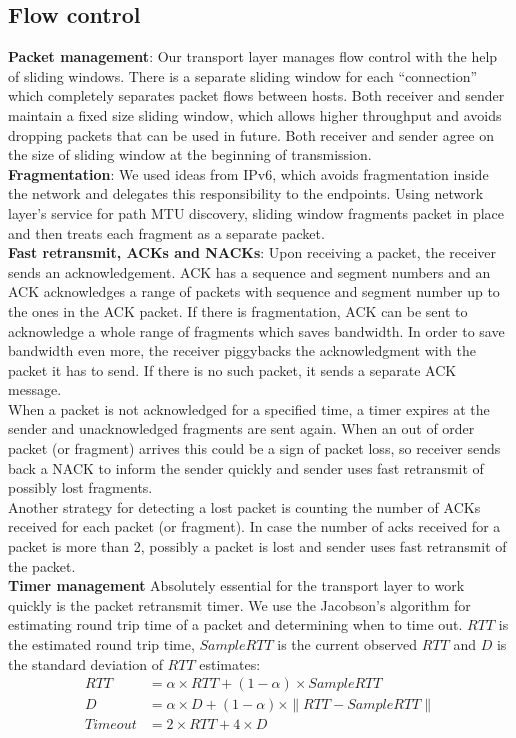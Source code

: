 \documentclass[11pt,a4paper,oneside]{report}
\begin{document}
\subsection{Flow control}
\noindent \textbf{Packet management}: Our transport layer manages flow control
with the help of sliding windows. There is a separate sliding window for each
``connection'' which completely separates packet flows between hosts. Both
receiver and sender maintain a fixed size sliding window, which allows higher
throughput and avoids dropping packets that can be used in future. Both receiver
and sender agree on the size of sliding window at the
beginning of transmission. \\
\noindent \textbf{Fragmentation}: We used ideas from IPv6, which avoids
fragmentation inside the network and delegates this responsibility to the
endpoints. Using network layer's service for path MTU discovery, sliding window
fragments packet in place and then treats each fragment as a separate packet. \\
\noindent \textbf{Fast retransmit, ACKs and NACKs}: Upon receiving a packet, the
receiver sends an acknowledgement. ACK has a sequence and segment numbers and an
ACK acknowledges a range of packets with sequence and segment number up to the
ones in the ACK packet. If there is fragmentation, ACK can be sent to
acknowledge a whole range of fragments which saves bandwidth. In order to save bandwidth
even more, the receiver piggybacks the acknowledgment with the packet it has to
send. If there is no such packet, it sends a separate ACK message. \\ When a
packet is not acknowledged for a specified time, a timer expires at the sender
and unacknowledged fragments are sent again. When an out of order packet (or
fragment) arrives this could be a sign of packet loss, so receiver sends back a
NACK to inform the sender quickly and sender uses fast retransmit of
possibly lost fragments. \\ 
Another strategy for detecting a lost packet is counting the number of ACKs
received for each packet (or fragment). In case the number of acks received for
a packet is more than 2, possibly a packet is lost and sender uses fast
retransmit of the packet. \\
\noindent \textbf{Timer management}
Absolutely essential for the transport layer to work quickly is the packet
retransmit timer. We use the Jacobson's algorithm for estimating round trip time 
of a packet and determining when to time out. $RTT$ is the estimated round trip
time, $SampleRTT$ is the current observed $RTT$ and $D$ is the standard
deviation of $RTT$ estimates:
\begin{align}
RTT & = \alpha \times RTT + (1-\alpha) \times SampleRTT \\
D & = \alpha \times D + (1-\alpha) \times \|RTT-SampleRTT\| \\
Timeout & = 2 \times RTT+4 \times D
\end{align}
\end{document}
